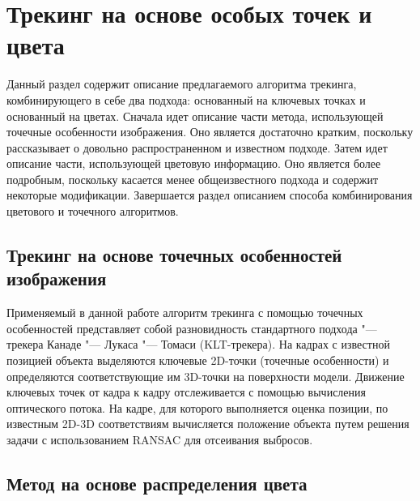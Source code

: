 \section{Трекинг на основе особых точек и цвета}\label{tracking}

Данный раздел содержит описание предлагаемого алгоритма трекинга,
комбинирующего в себе два подхода: основанный на ключевых точках
и основанный на цветах.
Сначала идет описание части метода, использующей точечные особенности
изображения.
Оно является достаточно кратким, поскольку рассказывает о довольно
распространенном и известном подходе.
Затем идет описание части, использующей цветовую информацию.
Оно является более подробным, поскольку касается менее общеизвестного
подхода и содержит некоторые модификации.
Завершается раздел описанием способа комбинирования цветового и точечного
алгоритмов.

\subsection{Трекинг на основе точечных особенностей изображения}
\label{subs:feat_tracking}

Применяемый в данной работе алгоритм трекинга с помощью точечных особенностей
представляет собой разновидность стандартного подхода "--- трекера
Канаде "--- Лукаса "--- Томаси
(KLT-трекера)\cite{LucasAndKanade,TomasiAndKanade,ShiAndTomasi,PyrLK}.
На кадрах с известной позицией объекта выделяются ключевые 2D-точки (точечные
особенности) и определяются соответствующие им 3D-точки на поверхности модели.
Движение ключевых точек от кадра к кадру отслеживается с помощью вычисления
оптического потока.
На кадре, для которого выполняется оценка позиции, по известным 2D-3D
соответствиям вычисляется положение объекта путем решения задачи
\PnP\cite{LepetitSurvey} с использованием RANSAC\cite{RANSAC} для отсеивания
выбросов.


\subsection{Метод на основе распределения цвета}


\newcommand{\Hf}{\ensuremath{H_f}}
\newcommand{\Hb}{\ensuremath{H_b}}
\newcommand{\uvec}{\ensuremath{\vect{u}}}
\newcommand{\hedist}{\ensuremath{\HeX{\CDistX{\uvec}}}}
\newcommand{\HistLocal}{\ensuremath{H_i}}
\newcommand{\HistLocalF}{\ensuremath{{\HistLocal}_f}}
\newcommand{\HistLocalB}{\ensuremath{{\HistLocal}_b}}


